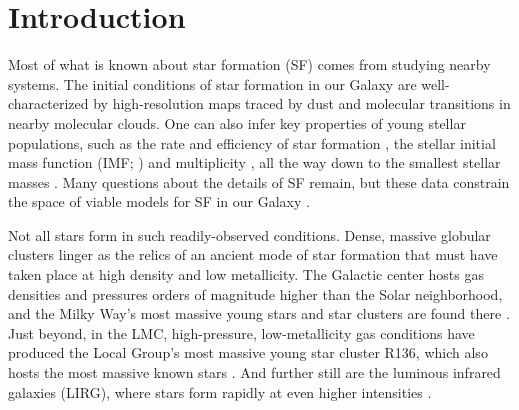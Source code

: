 \documentclass[apjl,twocolumn]{openjournal}
\begin{document}
\maketitle  


\section{Introduction}

Most of what is known about star formation (SF) comes from studying nearby systems. The initial conditions of star formation in our Galaxy are well-characterized by high-resolution maps traced by dust \citep{gutermuth:2009.dust.extinction, Andre_2010_filaments,lombardi:2010.sigma.gmc,heyer:2016.clumps} and molecular transitions \citep{heyer:2009.gmcs,kauffmann:2017.hcn,miville:2017.gmcs} in nearby molecular clouds.  One can also infer key properties of young stellar populations, such as the rate and efficiency of star formation \citep{heyer:2016.clumps,pokhrel:2021.gmc.sfe}, the stellar initial mass function (IMF; \citealt{Hopkins_A_2018_IMF_obs_review}) and multiplicity \citep{offner:2023.multiples.review}, all the way down to the smallest stellar masses \citep[e.g.][]{kirkpatrick:2023.browndwarf.imf}. Many questions about the details of SF remain, but these data constrain the space of viable models for SF in our Galaxy \citep{mckee:2007.review,krumholz:2014.review}.

Not all stars form in such readily-observed conditions. Dense, massive globular clusters linger as the relics of an ancient mode of star formation that must have taken place at high density and low metallicity. The Galactic center hosts gas densities and pressures orders of magnitude higher than the Solar neighborhood, and the Milky Way's most massive young stars and star clusters are found there \citep{2016A&A...595A..27G,2019ApJ...870...44H}. Just beyond, in the LMC, high-pressure, low-metallicity gas conditions have produced the Local Group's most massive young star cluster R136, which also hosts the most massive known stars \citep{Crowther_most_massive_stars_R136_2016}. And further still are the luminous infrared galaxies (LIRG), where stars form rapidly at even higher intensities \citep{kennicutt:1998.review}.
\end{document}
